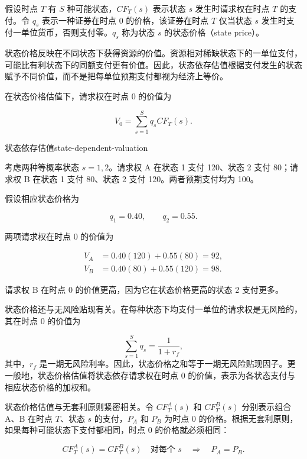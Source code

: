 假设时点 $T$ 有 $S$ 种可能状态，$CF_T(s)$ 表示状态 $s$ 发生时请求权在时点 $T$ 的支付。令 $q_s$ 表示一种证券在时点 0 的价格，该证券在时点 $T$ 仅当状态 $s$ 发生时支付一单位货币，否则支付零。$q_s$ 称为状态 $s$ 的状态价格（state price）。

状态价格反映在不同状态下获得资源的价值。资源相对稀缺状态下的一单位支付，可能比有利状态下的同额支付更有价值。因此，状态依存估值根据支付发生的状态赋予不同价值，而不是把每单位预期支付都视为经济上等价。

在状态价格估值下，请求权在时点 0 的价值为

\begin{equation}
V_0=\sum_{s=1}^{S}q_s CF_T(s).
\end{equation}

\begin{example}{状态依存估值}{state-dependent-valuation}

考虑两种等概率状态 $s=1,2$。请求权 A 在状态 1 支付 120、状态 2 支付 80；请求权 B 在状态 1 支付 80、状态 2 支付 120。两者预期支付均为 100。

假设相应状态价格为

$$
q_{1}=0.40,
\qquad
q_{2}=0.55.
$$

两项请求权在时点 0 的价值为

\begin{align}
V_A
&=
0.40(120)+0.55(80)=92,\\
V_B
&=0.40(80)+0.55(120)=98.
\end{align}

请求权 B 在时点 0 的价值更高，因为它在状态价格更高的状态 2 支付更多。

\end{example}

状态价格还与无风险贴现有关。在每种状态下均支付一单位的请求权是无风险的，其在时点 0 的价值为

\begin{equation}
\sum_{s=1}^{S}q_s=\frac{1}{1+r_f},
\label{eq:ch5-state-price-riskfree}
\end{equation}
其中，$r_f$ 是一期无风险利率。因此，状态价格之和等于一期无风险贴现因子。更一般地，状态价格估值将状态依存请求权在时点 0 的价值，表示为各状态支付与相应状态价格的加权和。

状态价格估值与无套利原则紧密相关。令 $CF_T^A(s)$ 和 $CF_T^B(s)$ 分别表示组合 A、B 在时点 $T$、状态 $s$ 的支付，$P_A$ 和 $P_B$ 为时点 0 的价格。根据无套利原则，如果每种可能状态下支付都相同，时点 0 的价格就必须相同：

\begin{equation}
CF_T^A(s)=CF_T^B(s)
\quad \text{对每个 } s
\quad \Longrightarrow \quad
P_A=P_B.
\label{eq:ch5-law-one-price}
\end{equation}

